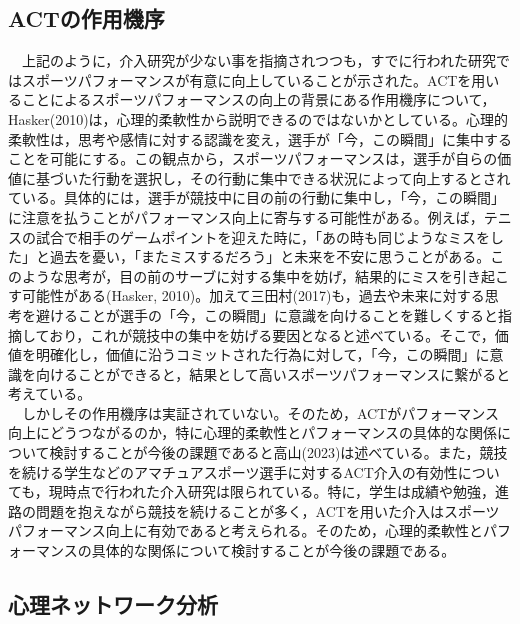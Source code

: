 \documentclass[12pt,a4paper,xelatex,ja=standard]{bxjsarticle}
\begin{document}
\hypertarget{actux306eux4f5cux7528ux6a5fux5e8f}{%
\subsection{ACTの作用機序}\label{actux306eux4f5cux7528ux6a5fux5e8f}}

　上記のように，介入研究が少ない事を指摘されつつも，すでに行われた研究ではスポーツパフォーマンスが有意に向上していることが示された。ACTを用いることによるスポーツパフォーマンスの向上の背景にある作用機序について，Hasker(2010)は，心理的柔軟性から説明できるのではないかとしている。心理的柔軟性は，思考や感情に対する認識を変え，選手が「今，この瞬間」に集中することを可能にする。この観点から，スポーツパフォーマンスは，選手が自らの価値に基づいた行動を選択し，その行動に集中できる状況によって向上するとされている。具体的には，選手が競技中に目の前の行動に集中し，「今，この瞬間」に注意を払うことがパフォーマンス向上に寄与する可能性がある。例えば，テニスの試合で相手のゲームポイントを迎えた時に，「あの時も同じようなミスをした」と過去を憂い，「またミスするだろう」と未来を不安に思うことがある。このような思考が，目の前のサーブに対する集中を妨げ，結果的にミスを引き起こす可能性がある(Hasker,
2010)。加えて三田村(2017)も，過去や未来に対する思考を避けることが選手の「今，この瞬間」に意識を向けることを難しくすると指摘しており，これが競技中の集中を妨げる要因となると述べている。そこで，価値を明確化し，価値に沿うコミットされた行為に対して，「今，この瞬間」に意識を向けることができると，結果として高いスポーツパフォーマンスに繋がると考えている。\\
　しかしその作用機序は実証されていない。そのため，ACTがパフォーマンス向上にどうつながるのか，特に心理的柔軟性とパフォーマンスの具体的な関係について検討することが今後の課題であると高山(2023)は述べている。また，競技を続ける学生などのアマチュアスポーツ選手に対するACT介入の有効性についても，現時点で行われた介入研究は限られている。特に，学生は成績や勉強，進路の問題を抱えながら競技を続けることが多く，ACTを用いた介入はスポーツパフォーマンス向上に有効であると考えられる。そのため，心理的柔軟性とパフォーマンスの具体的な関係について検討することが今後の課題である。

\hypertarget{ux5fc3ux7406ux30cdux30c3ux30c8ux30efux30fcux30afux5206ux6790}{%
\subsection{心理ネットワーク分析}\label{ux5fc3ux7406ux30cdux30c3ux30c8ux30efux30fcux30afux5206ux6790}}
\end{document}
